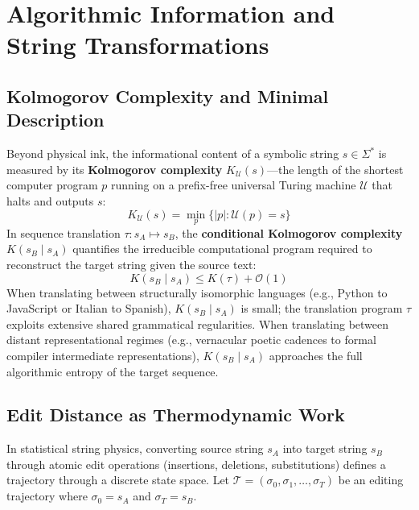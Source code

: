 \documentclass[11pt,letterpaper]{article}
\begin{document}
\section{Algorithmic Information and String Transformations}

\subsection{Kolmogorov Complexity and Minimal Description}
Beyond physical ink, the informational content of a symbolic string $s \in \Sigma^*$ is measured by its \textbf{Kolmogorov complexity} $K_{\mathcal{U}}(s)$---the length of the shortest computer program $p$ running on a prefix-free universal Turing machine $\mathcal{U}$ that halts and outputs $s$:
\begin{equation}
K_{\mathcal{U}}(s) = \min_{p} \big\{ |p| : \mathcal{U}(p) = s \big\}
\end{equation}
In sequence translation $\tau: s_A \mapsto s_B$, the \textbf{conditional Kolmogorov complexity} $K(s_B \mid s_A)$ quantifies the irreducible computational program required to reconstruct the target string given the source text:
\begin{equation}
K(s_B \mid s_A) \le K(\tau) + \mathcal{O}(1)
\end{equation}
When translating between structurally isomorphic languages (e.g., Python to JavaScript or Italian to Spanish), $K(s_B \mid s_A)$ is small; the translation program $\tau$ exploits extensive shared grammatical regularities. When translating between distant representational regimes (e.g., vernacular poetic cadences to formal compiler intermediate representations), $K(s_B \mid s_A)$ approaches the full algorithmic entropy of the target sequence.

\subsection{Edit Distance as Thermodynamic Work}
In statistical string physics, converting source string $s_A$ into target string $s_B$ through atomic edit operations (insertions, deletions, substitutions) defines a trajectory through a discrete state space. Let $\mathcal{T} = (\sigma_0, \sigma_1, \dots, \sigma_T)$ be an editing trajectory where $\sigma_0 = s_A$ and $\sigma_T = s_B$.
\end{document}
